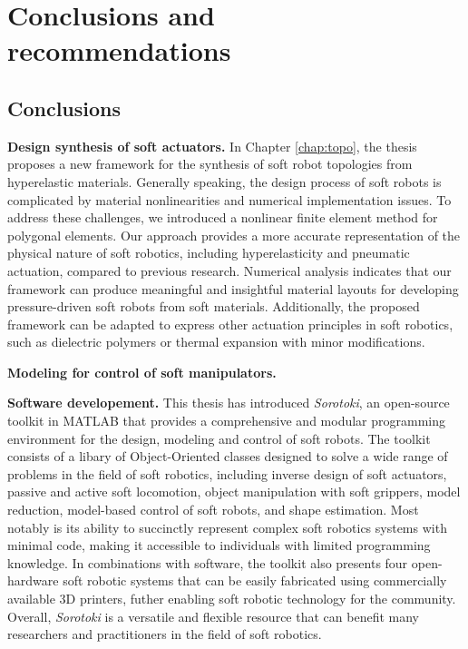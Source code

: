 \chapter[Conclusions and recommendations]{Conclusions and \\ recommendations}
\label{chap: conclusions}
\thispagestyle{empty}

\section{Conclusions}

\noindent \textbf{Design synthesis of soft actuators. } In Chapter \ref{chap:topo}, the thesis proposes a new framework for the synthesis of soft robot topologies from hyperelastic materials. Generally speaking, the design process of soft robots is complicated by material nonlinearities and numerical implementation issues. To address these challenges, we introduced a nonlinear finite element method for polygonal elements. Our approach provides a more accurate representation of the physical nature of soft robotics, including hyperelasticity and pneumatic actuation, compared to previous research. Numerical analysis indicates that our framework can produce meaningful and insightful material layouts for developing pressure-driven soft robots from soft materials. Additionally, the proposed framework can be adapted to express other actuation principles in soft robotics, such as dielectric polymers or thermal expansion with minor modifications.

\noindent \textbf{Modeling for control of soft manipulators.}

\noindent \textbf{Software developement.} This thesis has introduced \textit{Sorotoki}, an open-source toolkit in MATLAB that provides a comprehensive and modular programming environment for the design, modeling and control of soft robots. The toolkit consists of a libary of Object-Oriented classes designed to solve a wide range of problems in the field of soft robotics, including inverse design of soft actuators, passive and active soft locomotion, object manipulation with soft grippers, model reduction, model-based control of soft robots, and shape estimation. Most notably is its ability to succinctly represent complex soft robotics systems with minimal code, making it accessible to individuals with limited programming knowledge. In combinations with software, the toolkit also presents four open-hardware soft robotic systems that can be easily fabricated using commercially available 3D printers, futher enabling soft robotic technology for the community. Overall, \textit{Sorotoki} is a versatile and flexible resource that can benefit many researchers and practitioners in the field of soft robotics.


